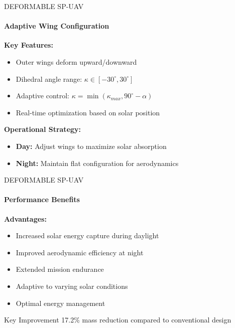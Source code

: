 \documentclass{beamer}
\begin{document}
\begin{frame}{DEFORMABLE SP-UAV}
    \framesubtitle{Adaptive Wing Configuration}
    
    \textbf{Key Features:}
    \begin{itemize}
        \item Outer wings deform upward/downward
        \item Dihedral angle range: $\kappa \in [-30^\circ, 30^\circ]$
        \item Adaptive control: $\kappa = \min(\kappa_{max}, 90^\circ - \alpha)$
        \item Real-time optimization based on solar position
    \end{itemize}
    
    \vspace{0.3cm}
    \textbf{Operational Strategy:}
    \begin{itemize}
        \item \textbf{Day:} Adjust wings to maximize solar absorption
        \item \textbf{Night:} Maintain flat configuration for aerodynamics
    \end{itemize}
\end{frame}

\begin{frame}{DEFORMABLE SP-UAV}
    \framesubtitle{Performance Benefits}
    
    \textbf{Advantages:}
    \begin{itemize}
        \item Increased solar energy capture during daylight
        \item Improved aerodynamic efficiency at night
        \item Extended mission endurance
        \item Adaptive to varying solar conditions
        \item Optimal energy management
    \end{itemize}
    
    \vspace{0.3cm}
    \begin{alertblock}{Key Improvement}
        17.2\% mass reduction compared to conventional design
    \end{alertblock}
\end{frame}
\end{document}
